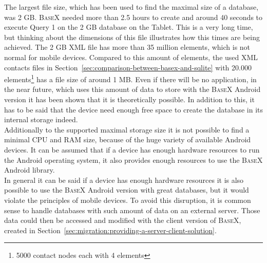 The largest file size, which has been used to find the maximal size of a database, was 2 GB.
\textsc{BaseX} needed more than 2.5 hours to create and around 40 seconds to execute Query 1 on the 2 GB database on the Tablet.
This is a very long time, but thinking about the dimensions of this file illustrates how this times are being achieved.
The 2 GB XML file has more than 35 million elements, which is not normal for mobile devices.
Compared to this amount of elements, the used XML contacts files in Section~\ref{sec:comparison-between-basex-and-sqlite} with 20.000 elements\footnote{5000 contact nodes each with 4 elements} has a file size of around 1 MB.
Even if there will be no application, in the near future, which uses this amount of data to store with the \textsc{BaseX} Android version it has been shown that it is theoretically possible.
In addition to this, it has to be said that the device need enough free space to create the database in its internal storage indeed.\\
Additionally to the supported maximal storage size it is not possible to find a minimal CPU and RAM size, because of the huge variety of available Android devices.
It can be assumed that if a device has enough hardware resources to run the Android operating system, it also provides enough resources to use the \textsc{BaseX} Android library.\\
In general it can be said if a device has enough hardware resources it is also possible to use the \textsc{BaseX} Android version with great databases, but it would violate the principles of mobile devices.
To avoid this disruption, it is common sense to handle databases with such amount of data on an external server.
Those data could then be accessed and modified with the client version of \textsc{BaseX}, created in Section~\ref{sec:migration:providing-a-server-client-solution}.




